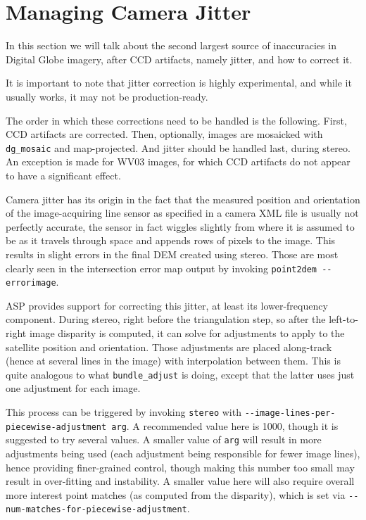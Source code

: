 \section{Managing Camera Jitter}
\label{sec:jitter}

In this section we will talk about the second largest source of
inaccuracies in Digital Globe imagery, after CCD artifacts, namely
jitter, and how to correct it. 

It is important to note that jitter correction is highly experimental,
and while it usually works, it may not be production-ready. 

The order in which these corrections need to be handled is the following. First,
CCD artifacts are corrected. Then, optionally, images are mosaicked with
\texttt{dg\_mosaic} and map-projected. And jitter should be handled
last, during stereo. An exception is made for WV03 images, for which CCD
artifacts do not appear to have a significant effect.

Camera jitter has its origin in the fact that the measured position and
orientation of the image-acquiring line sensor as specified in a camera
XML file is usually not perfectly accurate, the sensor in fact wiggles
slightly from where it is assumed to be as it travels through space and
appends rows of pixels to the image. This results in slight errors in
the final DEM created using stereo. Those are most clearly seen in the
intersection error map output by invoking \texttt{point2dem -\/-errorimage}.

ASP provides support for correcting this jitter, at least its
lower-frequency component. During stereo, right before the triangulation
step, so after the left-to-right image disparity is computed, it can
solve for adjustments to apply to the satellite position and
orientation. Those adjustments are placed along-track (hence at several
lines in the image) with interpolation between them. This is quite
analogous to what \texttt{bundle\_adjust} is doing, except that the
latter uses just one adjustment for each image.

This process can be triggered by invoking \texttt{stereo} with
\texttt{-\/-image-lines-per-piecewise-adjustment arg}. A recommended
value here is 1000, though it is suggested to try several values. A
smaller value of \texttt{arg} will result in more adjustments being used
(each adjustment being responsible for fewer image lines), hence
providing finer-grained control, though making this number too small may
result in over-fitting and instability. A smaller value here will also
require overall more interest point matches (as computed from the
disparity), which is set via
\texttt{-\/-num-matches-for-piecewise-adjustment}.


